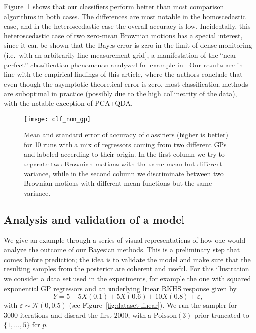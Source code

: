 Figure~\ref{fig:clf_non_gp} shows that our classifiers perform better than most comparison algorithms in both cases. The differences are most notable in the homoscedastic case, and in the heteroscedastic case the overall accuracy is low. Incidentally, this heteroscedastic case of two zero-mean Brownian motions has a special interest, since it can be shown that the Bayes error is zero in the limit of dense monitoring (i.e.\ with an arbitrarily fine measurement grid), a manifestation of the ``near-perfect'' classification phenomenon analyzed for example in \citet{torrecilla2020optimal}. Our results are in line with the empirical findings of this article, where the authors conclude that even though the asymptotic theoretical error is zero, most classification methods are suboptimal in practice (possibly due to the high collinearity of the data), with the notable exception of PCA+QDA.

\begin{figure}[ht!]
  \centering
  \texttt{[image: clf\_non\_gp]}
  \caption{Mean and standard error of accuracy of classifiers (higher is better) for 10 runs with a mix of regressors coming from two different GPs and labeled according to their origin. In the first column we try to separate two Brownian motions with the same mean but different variance, while in the second column we discriminate between two Brownian motions with different mean functions but the same variance.}\label{fig:clf_non_gp}
\end{figure}

\subsection{Analysis and validation of a model}\label{app:validation}

We give an example through a series of visual representations of how one would analyze the outcome of our Bayesian methods. This is a preliminary step that comes before prediction; the idea is to validate the model and make sure that the resulting samples from the posterior are coherent and useful. For this illustration we consider a data set used in the experiments, for example the one with squared exponential GP regressors and an underlying linear RKHS response given by
\[
Y=5 - 5X(0.1) + 5X(0.6) + 10X(0.8) + \varepsilon, 
\] 
with \(\varepsilon \sim \mathcal N(0, 0.5)\) (see Figure~\ref{fig:dataset-linear}). We run the sampler for \(3000\) iterations and discard the first \(2000\), with a \(\text{Poisson}(3)\) prior truncated to \(\{1,\dots,5\}\) for \(p\).

